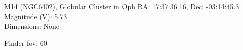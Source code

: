 \begin{block}{M14 (NGC6402), Globular Cluster in Oph}
    RA: 17:37:36.16, Dec: -03:14:45.3 \\ 
    Magnitude (V): 5.73 \\ 
    Dimensions: None 

    Finder fov: 60 
\end{block}